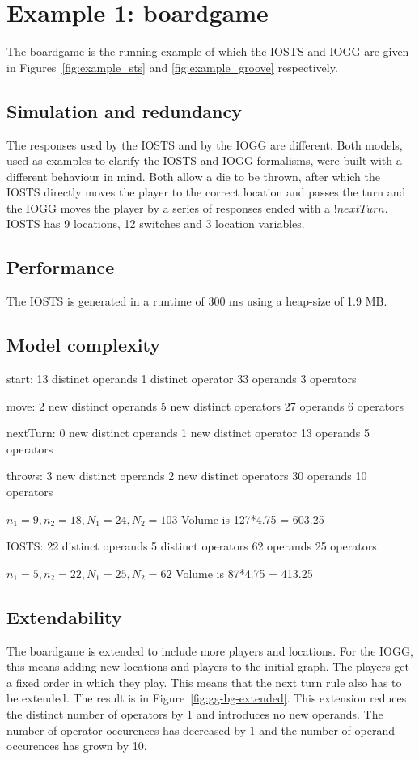 \section{Example 1: boardgame}
The boardgame is the running example of which the IOSTS and IOGG are given in Figures~\ref{fig:example_sts} and \ref{fig:example_groove} respectively.

\subsection{Simulation and redundancy}
The responses used by the IOSTS and by the IOGG are different. Both models, used as examples to clarify the IOSTS and IOGG formalisms, were built with a different behaviour in mind. Both allow a die to be thrown, after which the IOSTS directly moves the player to the correct location and passes the turn and the IOGG moves the player by a series of responses ended with a $!nextTurn$. IOSTS has 9 locations, 12 switches and 3 location variables.

\subsection{Performance}
The IOSTS is generated in a runtime of 300 ms using a heap-size of 1.9 MB.

\subsection{Model complexity}
start:
13 distinct operands
1 distinct operator
33 operands
3 operators

move:
2 new distinct operands
5 new distinct operators
27 operands
6 operators

nextTurn:
0 new distinct operands
1 new distinct operator
13 operands
5 operators

throws:
3 new distinct operands
2 new distinct operators
30 operands
10 operators

$n_1 = 9, n_2 = 18, N_1 = 24, N_2 = 103$ Volume is 127*4.75 = 603.25

IOSTS:
22 distinct operands
5 distinct operators
62 operands
25 operators

$n_1 = 5, n_2 = 22, N_1 = 25, N_2 = 62$ Volume is 87*4.75 = 413.25


\subsection{Extendability}
The boardgame is extended to include more players and locations. For the IOGG, this means adding new locations and players to the initial graph. The players get a fixed order in which they play. This means that the next turn rule also has to be extended. The result is in Figure~\ref{fig:gg-bg-extended}. This extension reduces the distinct number of operators by 1 and introduces no new operands. The number of operator occurences has decreased by 1 and the number of operand occurences has grown by 10.

